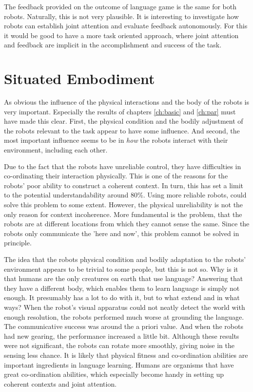 The feedback provided on the outcome of language game is the same for both robots. Naturally, this is not very plausible. It is interesting to investigate how robots can establish joint attention and evaluate feedback autonomously. For this it would be good to have a more task oriented approach, where joint attention and feedback are implicit in the accomplishment and success of the task.

\section{Situated Embodiment}\label{s:disc:phys}

As obvious the influence of the physical interactions and the body of the robots is very important. Especially the results of chapters \ref{ch:basic} and \ref{ch:par} must have made this clear. First, the physical condition and the bodily adjustment of the robots relevant to the task appear to have some influence. And second, the most important influence seems to be in {\em how} the robots interact with their environment, including each other.

Due to the fact that the robots have unreliable control, they have difficulties in co-ordinating their interaction physically. This is one of the reasons for the robots' poor ability to construct a coherent context. In turn, this has set a limit to the potential understandability around 80\%. Using more reliable robots, could solve this problem to some extent. However, the physical unreliability is not the only reason for context incoherence. More fundamental is the problem, that the robots are at different locations from which they cannot sense the same. Since the robots only communicate the 'here and now', this problem cannot be solved in principle.

The idea that the robots physical condition and bodily adaptation to the robots' environment appears to be trivial to some people, but this is not so. Why is it that humans are the only creatures on earth that use language? Answering that they have a different body, which enables them to learn language is simply not enough. It presumably has a lot to do with it, but to what extend and in what ways? When the robot's visual apparatus could not neatly detect the world with enough resolution, the robots performed much worse at grounding the language. The communicative success was around the a priori value. And when the robots had new gearing, the performance increased a little bit. Although these results were not significant, the robots can rotate more smoothly, giving noise in the sensing less chance. It is likely that physical fitness and co-ordination abilities are important ingredients in language learning. Humans are organisms that have great co-ordination abilities, which especially become handy in setting up coherent contexts and joint attention.

